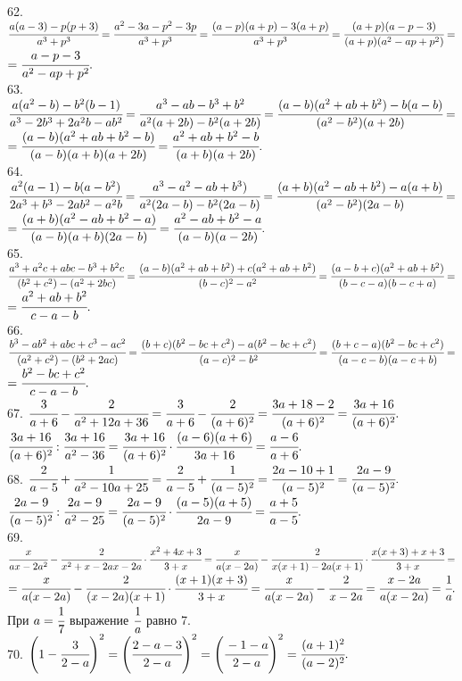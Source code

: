\documentclass[12pt]{article}
\begin{document}
62. $\cfrac{a(a-3)-p(p+3)}{a^3+p^3}=\cfrac{a^2-3a-p^2-3p}{a^3+p^3}=\cfrac{(a-p)(a+p)-3(a+p)}{a^3+p^3}=\cfrac{(a+p)(a-p-3)}{(a+p)(a^2-ap+p^2)}=$\\$
=\cfrac{a-p-3}{a^2-ap+p^2}.$\\
63. $\cfrac{a(a^2-b)-b^2(b-1)}{a^3-2b^3+2a^2b-ab^2}=\cfrac{a^3-ab-b^3+b^2}{a^2(a+2b)-b^2(a+2b)}=
\cfrac{(a-b)(a^2+ab+b^2)-b(a-b)}{(a^2-b^2)(a+2b)}=$\\$=\cfrac{(a-b)(a^2+ab+b^2-b)}{(a-b)(a+b)(a+2b)}=
\cfrac{a^2+ab+b^2-b}{(a+b)(a+2b)}.$\\
64. $\cfrac{a^2(a-1)-b(a-b^2)}{2a^3+b^3-2ab^2-a^2b}=\cfrac{a^3-a^2-ab+b^3)}{a^2(2a-b)-b^2(2a-b)}=
\cfrac{(a+b)(a^2-ab+b^2)-a(a+b)}{(a^2-b^2)(2a-b)}=$\\$=\cfrac{(a+b)(a^2-ab+b^2-a)}{(a-b)(a+b)(2a-b)}=\cfrac{a^2-ab+b^2-a}{(a-b)(a-2b)}.$\\
65. $\cfrac{a^3+a^2c+abc-b^3+b^2c}{(b^2+c^2)-(a^2+2bc)}=\cfrac{(a-b)(a^2+ab+b^2)+c(a^2+ab+b^2)}{(b-c)^2-a^2}=
\cfrac{(a-b+c)(a^2+ab+b^2)}{(b-c-a)(b-c+a)}=$\\$=\cfrac{a^2+ab+b^2}{c-a-b}.$\\
66. $\cfrac{b^3-ab^2+abc+c^3-ac^2}{(a^2+c^2)-(b^2+2ac)}=\cfrac{(b+c)(b^2-bc+c^2)-a(b^2-bc+c^2)}{(a-c)^2-b^2}=
\cfrac{(b+c-a)(b^2-bc+c^2)}{(a-c-b)(a-c+b)}=$\\$=\cfrac{b^2-bc+c^2}{c-a-b}.$\\
67. $\cfrac{3}{a+6}-\cfrac{2}{a^2+12a+36}=\cfrac{3}{a+6}-\cfrac{2}{(a+6)^2}=\cfrac{3a+18-2}{(a+6)^2}=\cfrac{3a+16}{(a+6)^2}.$\\
$\cfrac{3a+16}{(a+6)^2}:\cfrac{3a+16}{a^2-36}=\cfrac{3a+16}{(a+6)^2}\cdot\cfrac{(a-6)(a+6)}{3a+16}=\cfrac{a-6}{a+6}.$\\
68. $\cfrac{2}{a-5}+\cfrac{1}{a^2-10a+25}=\cfrac{2}{a-5}+\cfrac{1}{(a-5)^2}=\cfrac{2a-10+1}{(a-5)^2}=\cfrac{2a-9}{(a-5)^2}.$\\
$\cfrac{2a-9}{(a-5)^2}:\cfrac{2a-9}{a^2-25}=\cfrac{2a-9}{(a-5)^2}\cdot\cfrac{(a-5)(a+5)}{2a-9}=\cfrac{a+5}{a-5}.$\\
69. $\cfrac{x}{ax-2a^2}-\cfrac{2}{x^2+x-2ax-2a}\cdot\cfrac{x^2+4x+3}{3+x}=\cfrac{x}{a(x-2a)}-\cfrac{2}{x(x+1)-2a(x+1)}\cdot\cfrac{x(x+3)+x+3}{3+x}=$\\$=
\cfrac{x}{a(x-2a)}-\cfrac{2}{(x-2a)(x+1)}\cdot\cfrac{(x+1)(x+3)}{3+x}=\cfrac{x}{a(x-2a)}-\cfrac{2}{x-2a}=
\cfrac{x-2a}{a(x-2a)}=\cfrac{1}{a}.$ При $a=\cfrac{1}{7}$ выражение $\cfrac{1}{a}$ равно 7.\\
70. $\left(1-\cfrac{3}{2-a}\right)^2=\left(\cfrac{2-a-3}{2-a}\right)^2=\left(\cfrac{-1-a}{2-a}\right)^2=\cfrac{(a+1)^2}{(a-2)^2}.$\\
\end{document}
